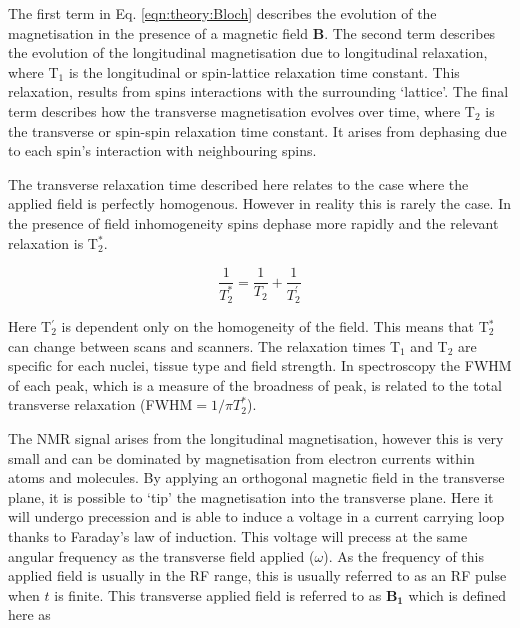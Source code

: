 The first term in Eq. \ref{eqn:theory:Bloch} describes the evolution of the magnetisation in the presence of a magnetic field $\mathbf{B}$. The second term describes the evolution of the longitudinal magnetisation due to longitudinal relaxation, where T$_1$ is the longitudinal or spin-lattice relaxation time constant. This relaxation, results from spins interactions with the surrounding `lattice'. The final term describes how the transverse magnetisation evolves over time, where T$_2$ is the transverse or spin-spin relaxation time constant. It arises from dephasing due to each spin's interaction with neighbouring spins. 

The transverse relaxation time described here relates to the case where the applied field is perfectly homogenous. However in reality this is rarely the case. In the presence of field inhomogeneity spins dephase more rapidly and the relevant relaxation is T$_2^*$.

\begin{equation}
    \frac{1}{T_2^*} = \frac{1}{T_2} + \frac{1}{T_2^{'}}
    \label{eqn:theory:trans}
\end{equation}

Here T$_2^{'}$ is dependent only on the homogeneity of the field. This means that T$_2^*$ can change between scans and scanners. The relaxation times T$_1$ and T$_2$ are specific for each nuclei, tissue type and field strength. In spectroscopy the \ac{FWHM} of each peak, which is a measure of the broadness of peak, is related to the total transverse relaxation (\ac{FWHM}$ = 1 / \pi T_2^*$). 


The \ac{NMR} signal arises from the longitudinal magnetisation, however this is very small and can be dominated by magnetisation from electron currents within atoms and molecules. By applying an orthogonal magnetic field in the transverse plane, it is possible to `tip' the magnetisation into the transverse plane. Here it will undergo precession and is able to induce a voltage in a current carrying loop thanks to Faraday's law of induction. This voltage will precess at the same angular frequency as the transverse field applied ($\omega$). As the frequency of this applied field is usually in the \ac{RF} range, this is usually referred to as an \ac{RF} pulse when $t$ is finite. This transverse applied field is referred to as $\mathbf{B_1}$ which is defined here as

